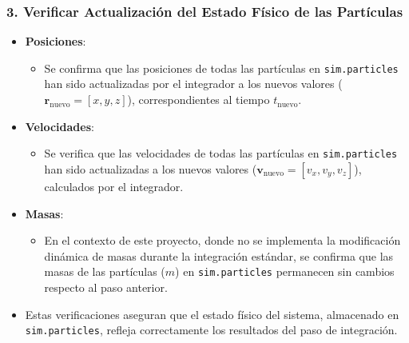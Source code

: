 \subsubsection*{3. Verificar Actualización del Estado Físico de las Partículas}
\begin{itemize}
    \item \textbf{Posiciones}:
    \begin{itemize}
        \item Se confirma que las posiciones de todas las partículas en \texttt{sim.particles} han sido actualizadas por el integrador a los nuevos valores ($\mathbf{r}_{\text{nuevo}} = [x, y, z]$), correspondientes al tiempo $t_{\text{nuevo}}$.
    \end{itemize}
    \item \textbf{Velocidades}:
    \begin{itemize}
        \item Se verifica que las velocidades de todas las partículas en \texttt{sim.particles} han sido actualizadas a los nuevos valores ($\mathbf{v}_{\text{nuevo}} = [v_x, v_y, v_z]$), calculados por el integrador.
    \end{itemize}
    \item \textbf{Masas}:
    \begin{itemize}
        \item En el contexto de este proyecto, donde no se implementa la modificación dinámica de masas durante la integración estándar, se confirma que las masas de las partículas ($m$) en \texttt{sim.particles} permanecen sin cambios respecto al paso anterior.
    \end{itemize}
    \item Estas verificaciones aseguran que el estado físico del sistema, almacenado en \texttt{sim.particles}, refleja correctamente los resultados del paso de integración.
\end{itemize}

